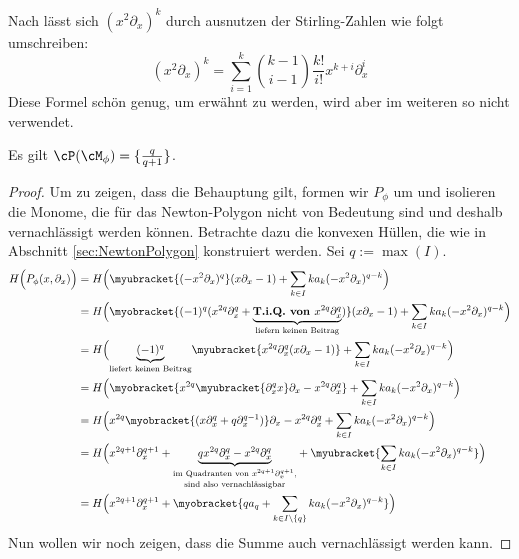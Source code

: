 \begin{bem}
Nach \cite[Chap 4]{comtet1974advanced} lässt sich $(x^2\partial_x)^k$ durch
ausnutzen der Stirling-Zahlen wie folgt umschreiben:
\[
(x^2\partial_x)^k=\sum_{i=1}^k\binom{k-1}{i-1}\frac{k!}{i!}x^{k+i}\partial_x^i
\]
Diese Formel schön genug, um erwähnt zu werden, wird aber im weiteren so nicht
verwendet.
\begin{comment}
TODO: prüfen für kleine zahlen!!!
\end{comment}
\end{bem}

\begin{lem}
Es gilt $\cP(\cM_{\phi})=\{\frac{q}{q+1}\}$.
\end{lem}
\begin{proof}
\begin{comment}
\cite[5.b.]{sabbah_Fourier-local}
\end{comment}
Um zu zeigen, dass die Behauptung gilt, formen wir $P_{\phi}$ um und isolieren
die Monome, die für das Newton-Polygon nicht von Bedeutung sind und deshalb
vernachlässigt werden können. Betrachte dazu die konvexen Hüllen, die wie in
Abschnitt \ref{sec:NewtonPolygon} konstruiert werden. Sei $q:=\max(I)$.
\begin{align*}
H\Big(P_{\phi}(x,\partial_x)\Big) &= H\Big(\myubracket{(-x^2\partial_x)^{q}}
  (x\partial_x-1) + \sum_{k\in I}k a_k(-x^2\partial_x)^{q-k}\Big)
\\&= H\Big(\myobracket{(-1)^q(x^{2q}\partial_x^q
  + \underset{\text{liefern keinen Beitrag}}{
  \underbrace{\textbf{T.i.Q. von }x^{2q}\partial_x^q}})}
  (x\partial_x - 1) + \sum_{k\in I}k a_k(-x^2\partial_x)^{q-k} \Big)
\\&= H\Big(\underset{\text{liefert keinen Beitrag}}{\underbrace{(-1)^q}}
  \myubracket{x^{2q}\partial_x^q (x\partial_x - 1)}
  + \sum_{k\in I}k a_k(-x^2\partial_x)^{q-k} \Big)
\\&= H\Big(\myobracket{x^{2q}\myubracket{\partial_x^q x}\partial_x
  - x^{2q}\partial_x^q} + \sum_{k\in I}k a_k(-x^2\partial_x)^{q-k} \Big)
\\&= H\Big(x^{2q}\myobracket{(x\partial_x^q + q\partial_x^{q-1})}\partial_x
  - x^{2q}\partial_x^q + \sum_{k\in I}k a_k(-x^2\partial_x)^{q-k} \Big)
\\&= H\Big(x^{2q + 1}\partial_x^{q + 1}
  + \underset{\text{sind also vernachlässigbar}}{
  \underset{\text{im Quadranten von $x^{2q + 1}\partial_x^{q + 1}$,}}{
  \underbrace{qx^{2q}\partial_x^{q} - x^{2q}\partial_x^q}}}
  +\myubracket{ \sum_{k\in I}k a_k(-x^2\partial_x)^{q-k}} \Big)
\\&= H\Big(x^{2q + 1}\partial_x^{q + 1} +\myobracket{ qa_q
  + \sum_{k\in I\backslash\{q\}}k a_k(-x^2\partial_x)^{q-k}} \Big)
\end{align*}
Nun wollen wir noch zeigen, dass die Summe auch vernachlässigt werden kann.

\end{proof}
